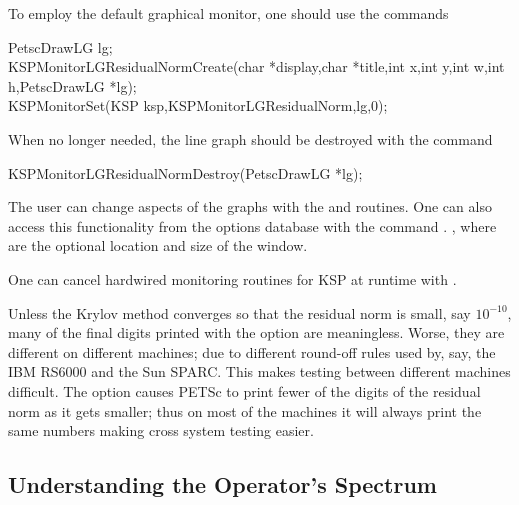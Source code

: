 To employ the default graphical monitor, one should use the
commands
\begin{tabbing}
   PetscDrawLG lg;\\
  KSPMonitorLGResidualNormCreate(char *display,char *title,int x,int y,int w,int h,PetscDrawLG *lg);\\
  KSPMonitorSet(KSP ksp,KSPMonitorLGResidualNorm,lg,0);
\end{tabbing}
When no longer needed, the line graph should be destroyed
with the command
\begin{tabbing}
  KSPMonitorLGResidualNormDestroy(PetscDrawLG *lg);
\end{tabbing}
The user can change aspects of the graphs with the  and
 routines.  
One can also access this functionality from the options database
with the command  \trl{[x,y,w,h]}. ,
where  are the optional location and size of the window.

One can cancel hardwired monitoring routines for KSP at runtime with
. 

Unless the Krylov method converges so that the residual norm is small,
say $ 10^{-10} $, many of the final digits printed with the 
option are meaningless. Worse, they are different on different
machines; due to different round-off rules used by, say, the IBM RS6000
and the Sun SPARC. This makes testing between different machines
difficult. The option  
causes PETSc to print fewer of the digits of the residual norm
as it gets smaller; thus on most of the machines it will always
print the same numbers making cross system testing easier.


\subsection{Understanding the Operator's Spectrum}


